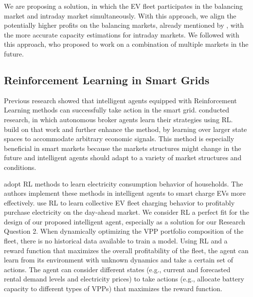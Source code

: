 \documentclass[12pt, article]{article}
\begin{document}
We are proposing a solution, in which the EV fleet participates in the balancing
market and intraday market simultaneously. With this approach, we align the
potentially higher profits on the balancing markets, already mentioned by
\textcite{tomic07_using_fleet_elect_drive_vehic_grid_suppor}, with the more
accurate capacity estimations for intraday markets. We followed
\textcite{kahlen17_fleet} with this approach, who proposed to work on a combination
of multiple markets in the future.


\subsection{Reinforcement Learning in Smart Grids}
\label{sec:orgaba83b6}

Previous research showed that intelligent agents equipped with Reinforcement
Learning methods can successfully take action in the smart grid.
\textcite{reddy11_strat,reddy11_learn_behav_multip_auton_agent} conducted
research, in which autonomous broker agents \parencite{ketter13_power_tac} learn
their strategies using RL. \textcite{peters13_reinf_learn_approac_to_auton} build
on that work and further enhance the method, by learning over larger state
spaces to accommodate arbitrary economic signals. This method is especially
beneficial in smart markets because the markets structures might change in the
future and intelligent agents should adapt to a variety of market structures and
conditions.

\parencite{vazquez-canteli19_reinf_learn_deman_respon}


\textcite{valogianni14_effec_manag_elect_vehic_storag} adopt RL methods to learn
electricity consumption behavior of households. The authors implement these
methods in intelligent agents to smart charge EVs more effectively.
\textcite{vandael15_reinf_learn_heuris_ev_fleet} use RL to learn collective EV
fleet charging behavior to profitably purchase electricity on the day-ahead
market. We consider RL a perfect fit for the design of our proposed intelligent
agent, especially as a solution for our Research Question 2. When dynamically
optimizing the VPP portfolio composition of the fleet, there is no historical
data available to train a model. Using RL and a reward function that maximizes
the overall profitability of the fleet, the agent can learn from its environment
with unknown dynamics and take a certain set of actions. The agent can consider
different states (e.g., current and forecasted rental demand levels and
electricity prices) to take actions (e.g., allocate battery capacity to different
types of VPPs) that maximizes the reward function.
\end{document}
